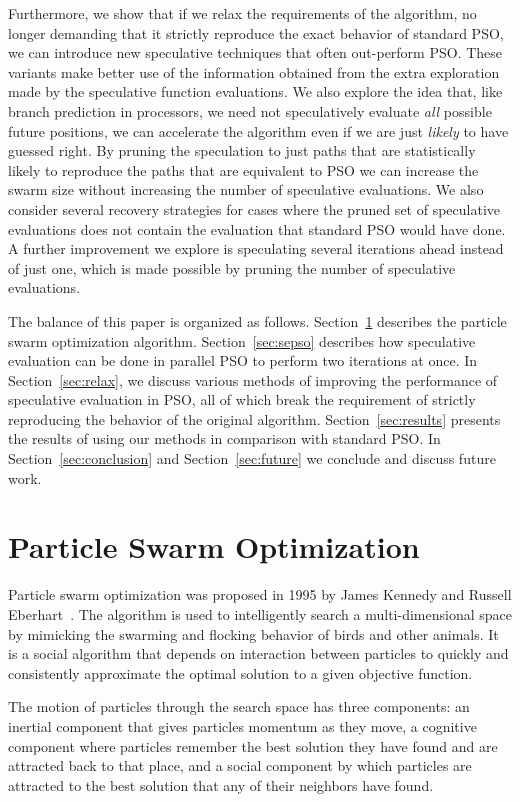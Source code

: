 \documentclass[journal,letterpaper]{IEEEtran}
\renewcommand{\sec}[1]{Section~\ref{sec:#1}}
\begin{document}
Furthermore, we show that if we relax the requirements of the algorithm, no
longer demanding that it strictly reproduce the exact behavior of standard PSO,
we can introduce new speculative techniques that often out-perform PSO.  These
variants make better use of the information obtained from the extra exploration
made by the speculative function evaluations.  We also explore the idea that,
like branch prediction in processors, we need not speculatively evaluate
\emph{all} possible future positions, we can accelerate the algorithm even if
we are just \emph{likely} to have guessed right.  By pruning the speculation to
just paths that are statistically likely to reproduce the paths that are
equivalent to PSO we can increase the swarm size without increasing the number
of speculative evaluations.  We also consider several recovery strategies for
cases where the pruned set of speculative evaluations does not contain the
evaluation that standard PSO would have done.  A further improvement we explore
is speculating several iterations ahead instead of just one, which is made
possible by pruning the number of speculative evaluations.

The balance of this paper is organized as follows. \sec{pso} describes the
particle swarm optimization algorithm.  \sec{sepso} describes how speculative
evaluation can be done in parallel PSO to perform two iterations at once.  In
\sec{relax}, we discuss various methods of improving the performance of
speculative evaluation in PSO, all of which break the requirement of strictly
reproducing the behavior of the original algorithm.  \sec{results} presents the
results of using our methods in comparison with standard PSO.  In
\sec{conclusion} and \sec{future} we conclude and discuss future work.

\section{Particle Swarm Optimization}
\label{sec:pso}

Particle swarm optimization was proposed in 1995 by James Kennedy and Russell
Eberhart~\cite{kennedy-1995-particle-swarm-optimization}.  The algorithm is
used to intelligently search a multi-dimensional space by mimicking the
swarming and flocking behavior of birds and other animals. It is a social
algorithm that depends on interaction between particles to quickly and
consistently approximate the optimal solution to a given objective function.

The motion of particles through the search space has three components: an
inertial component that gives particles momentum as they move, a cognitive
component where particles remember the best solution they have found and are
attracted back to that place, and a social component by which particles are
attracted to the best solution that any of their neighbors have found.
\end{document}
